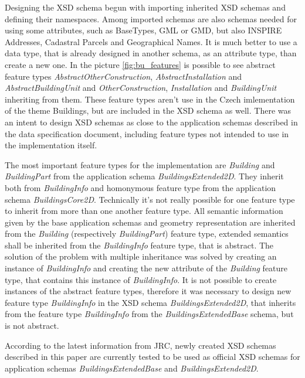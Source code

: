 \documentclass[eprint]{actapoly}
\begin{document}
Designing the XSD schema begun with importing inherited XSD schemas and defining their namespaces. Among imported schemas are also schemas needed for using some attributes, such as BaseTypes, GML or GMD, but also INSPIRE Addresses, Cadastral Parcels and Geographical Names. It is much better to use a data type, that is already designed in another schema, as an attribute type, than create a new one. In the picture \ref{fig:bu_features} is possible to see abstract feature types \textit{AbstractOtherConstruction}, \textit{AbstractInstallation}  and \textit{AbstractBuildingUnit} and \textit{OtherConstruction}, \textit{Installation} and \textit{BuildingUnit} inheriting from them. These feature types aren't use in the Czech imlementation of the theme Buildings, but are included in the XSD schema as well. There was an intent to design XSD schemas as close to the application schemas described in the data specification document, including feature types not intended to use in the implementation itself.

The most important feature types for the implementation are \textit{Building }and \textit{BuildingPart }from the application schema \textit{BuildingsExtended2D}. They inherit both from \textit{BuildingInfo} and homonymous feature type from the application schema \textit{BuildingsCore2D}. Technically it's not really possible for one feature type to inherit from more than one another feature type. All semantic information given by the base application schemas and geometry representation are inherited from the \textit{Building} (respectively \textit{BuildingPart}) feature type, extended semantics shall be inherited from the \textit{BuildingInfo} feature type, that is abstract. The solution of the problem with multiple inheritance was solved by creating an instance of \textit{BuildingInfo} and creating the new attribute of the \textit{Building }feature type, that contains this instance of \textit{BuildingInfo}. It is not possible to create instances of the abstract feature types,  therefore it was necessary to design new feature type \textit{BuildingInfo} in the XSD schema \textit{BuildingsExtended2D}, that inherits from the feature type \textit{BuildingInfo} from the \textit{BuildingsExtendedBase} schema, but is not abstract. 

According to the latest information from JRC, newly created XSD schemas described in this paper are currently tested to be used as official XSD schemas for application schemas \textit{BuildingsExtendedBase} and \textit{BuildingsExtended2D}. 
\end{document}
